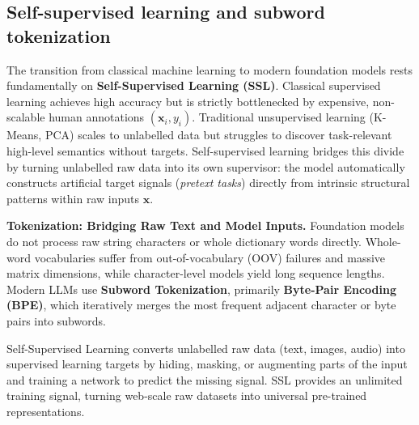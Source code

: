 \documentclass[11pt,a4paper]{article}
\begin{document}
	\subsection{Self-supervised learning and subword tokenization}
	
	The transition from classical machine learning to modern foundation models rests fundamentally on \textbf{Self-Supervised Learning (SSL)}. Classical supervised learning achieves high accuracy but is strictly bottlenecked by expensive, non-scalable human annotations $(\mathbf{x}_i, y_i)$. Traditional unsupervised learning (K-Means, PCA) scales to unlabelled data but struggles to discover task-relevant high-level semantics without targets. Self-supervised learning bridges this divide by turning unlabelled raw data into its own supervisor: the model automatically constructs artificial target signals (\emph{pretext tasks}) directly from intrinsic structural patterns within raw inputs $\mathbf{x}$.

	\textbf{Tokenization: Bridging Raw Text and Model Inputs.} Foundation models do not process raw string characters or whole dictionary words directly. Whole-word vocabularies suffer from out-of-vocabulary (OOV) failures and massive matrix dimensions, while character-level models yield long sequence lengths. Modern LLMs use \textbf{Subword Tokenization}, primarily \textbf{Byte-Pair Encoding (BPE)}, which iteratively merges the most frequent adjacent character or byte pairs into subwords.

	\begin{practicebox}

	\end{practicebox}

	\begin{keyconcept}
		Self-Supervised Learning converts unlabelled raw data (text, images, audio) into supervised learning targets by hiding, masking, or augmenting parts of the input and training a network to predict the missing signal. SSL provides an unlimited training signal, turning web-scale raw datasets into universal pre-trained representations.
	\end{keyconcept}
	
\end{document}
